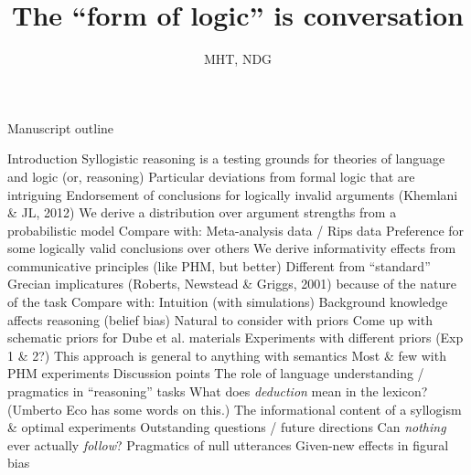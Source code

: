 \documentclass{article}
\begin{document}
\title{The ``form of logic'' is conversation}
\author{MHT, NDG} \maketitle
 
\begin{outline}

\0 Manuscript outline
	
	\1 Introduction
		\2 Syllogistic reasoning is a testing grounds for theories of language and logic (or, reasoning)
		\2 Particular deviations from formal logic that are intriguing
			\3 Endorsement of conclusions for logically invalid arguments (Khemlani \& JL, 2012)
				\4 We derive a distribution over argument strengths from a probabilistic model
				\4 Compare with: Meta-analysis data / Rips data
			\3 Preference for some logically valid conclusions over others
				\4 We derive informativity effects from communicative principles (like PHM, but better)
				\4 Different from ``standard'' Grecian implicatures (Roberts, Newstead \& Griggs, 2001) because of the nature of the task
				\4 Compare with: Intuition (with simulations)
		\2 Background knowledge affects reasoning (belief bias)
			\3 Natural to consider with priors
				\4 Come up with schematic priors for Dube et al. materials
				\4 Experiments with different priors (Exp 1 \& 2?)
		\2 This approach is general to anything with semantics
			\3 Most \& few with PHM experiments
		\2 Discussion points
			\3 The role of language understanding / pragmatics in ``reasoning'' tasks
				\4 What does \emph{deduction} mean in the lexicon? (Umberto Eco has some words on this.)
			\3 The informational content of a syllogism \& optimal experiments
		\2 Outstanding questions / future directions
			\3 Can \emph{nothing} ever actually \emph{follow}?
				\4 Pragmatics of null utterances
			\3 Given-new effects in figural bias


\end{outline}
\end{document}
